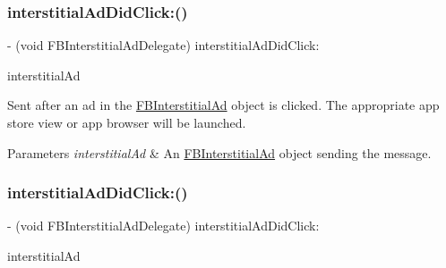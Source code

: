 \subsubsection{\texorpdfstring{interstitial\+Ad\+Did\+Click\+:()}{interstitialAdDidClick:()}\hspace{0.1cm}{\footnotesize\ttfamily [2/5]}}
{\footnotesize\ttfamily -\/ (void F\+B\+Interstitial\+Ad\+Delegate) interstitial\+Ad\+Did\+Click\+: \begin{DoxyParamCaption}\item[{(\hyperlink{interfaceFBInterstitialAd}{F\+B\+Interstitial\+Ad} $\ast$)}]{interstitial\+Ad }\end{DoxyParamCaption}\hspace{0.3cm}{\ttfamily [optional]}}

Sent after an ad in the \hyperlink{interfaceFBInterstitialAd}{F\+B\+Interstitial\+Ad} object is clicked. The appropriate app store view or app browser will be launched.


\begin{DoxyParams}{Parameters}
{\em interstitial\+Ad} & An \hyperlink{interfaceFBInterstitialAd}{F\+B\+Interstitial\+Ad} object sending the message. \\
\hline
\end{DoxyParams}
\mbox{\label{protocolFBInterstitialAdDelegate_01-p_a03799a3b2c114c7169b0cb1cf7c81132}} 
\subsubsection{\texorpdfstring{interstitial\+Ad\+Did\+Click\+:()}{interstitialAdDidClick:()}\hspace{0.1cm}{\footnotesize\ttfamily [3/5]}}
{\footnotesize\ttfamily -\/ (void F\+B\+Interstitial\+Ad\+Delegate) interstitial\+Ad\+Did\+Click\+: \begin{DoxyParamCaption}\item[{(\hyperlink{interfaceFBInterstitialAd}{F\+B\+Interstitial\+Ad} $\ast$)}]{interstitial\+Ad }\end{DoxyParamCaption}\hspace{0.3cm}{\ttfamily [optional]}}

